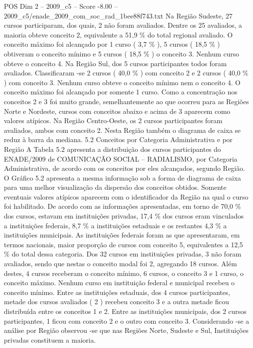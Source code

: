 \begin{textsample}{POS Dim 2 – 2009\_c5 – Score -8.00 – 2009\_c5/enade\_2009\_com\_soc\_rad\_1bee88f743.txt}
Na Região Sudeste, 27 cursos participaram, dos quais, 2 não foram avaliados.
Dentre os 25 avaliados, a maioria obteve conceito 2, equivalente a 51,9 \% do total regional avaliado.
O conceito máximo foi alcançado por 1 curso ( 3,7 \% ), 5 cursos ( 18,5 \% ) obtiveram o conceito mínimo e 5 cursos ( 18,5 \% ) o conceito 3.
Nenhum curso obteve o conceito 4.
Na Região Sul, dos 5 cursos participantes todos foram avaliados.
Classificaram -se 2 cursos ( 40,0 \% ) com conceito 2 e 2 cursos ( 40,0 \% ) com conceito 3.
Nenhum curso obteve o conceito mínimo nem o conceito 4.
O conceito máximo foi alcançado por somente 1 curso.
Como a concentração nos conceitos 2 e 3 foi muito grande, semelhantemente ao que ocorreu para as Regiões Norte e Nordeste, cursos com conceitos abaixo e acima de 3 aparecem como valores atípicos.
Na Região Centro-Oeste, os 2 cursos participantes foram avaliados, ambos com conceito 2.
Nesta Região também o diagrama de caixa se reduz à barra da mediana. 5.2 Conceitos por Categoria Administrativa e por Região A Tabela 5.2 apresenta a distribuição dos cursos participantes do ENADE/2009 de COMUNICAÇÃO SOCIAL – RADIALISMO, por Categoria Administrativa, de acordo com os conceitos por eles alcançados, segundo Região.
O Gráfico 5.2 apresenta a mesma informação sob a forma de diagrama de caixa para uma melhor visualização da dispersão dos conceitos obtidos.
Somente eventuais valores atípicos aparecem com o identificador da Região na qual o curso foi habilitado.
De acordo com as informações apresentadas, em torno de 70,0 \% dos cursos, estavam em instituições privadas, 17,4 \% dos cursos eram vinculados a instituições federais, 8,7 \% a instituições estaduais e os restantes 4,3 \% a instituições municipais.
As instituições federais foram as que apresentaram, em termos nacionais, maior proporção de cursos com conceito 5, equivalentes a 12,5 \% do total dessa categoria.
Dos 32 cursos em instituições privadas, 3 não foram avaliados, sendo que nestas o conceito modal foi 2, agregando 18 cursos.
Além destes, 4 cursos receberam o conceito mínimo, 6 cursos, o conceito 3 e 1 curso, o conceito máximo.
Nenhum curso em instituição federal e municipal recebeu o conceito mínimo.
Entre as instituições estaduais, dos 4 cursos participantes, metade dos cursos avaliados ( 2 ) recebeu conceito 3 e a outra metade ficou distribuída entre os conceitos 1 e 2.
Entre as instituições municipais, dos 2 cursos participantes, 1 ficou com conceito 2 e o outro com conceito 3.
Considerando -se a análise por Região observou -se que nas Regiões Norte, Sudeste e Sul, Instituições privadas constituem a maioria.

\end{textsample}
